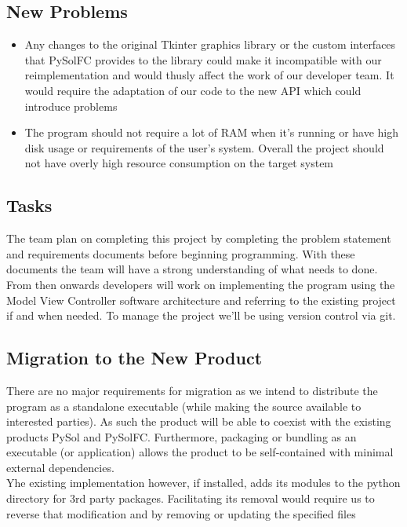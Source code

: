 \documentclass{article}
\begin{document}
		\subsection{New Problems}
		\begin{itemize}
		\itemsep0em	
			\item Any changes to the original Tkinter graphics library or the 
			custom interfaces that PySolFC provides to the library could make it
			incompatible with our reimplementation and would thusly affect the work of
			our developer team. It would require the adaptation of our code to the new
			API which could introduce problems
			\item The program should not require a lot of RAM when it’s running or
			have high disk usage or requirements of the user’s system. Overall the
			project should not have overly high resource consumption on the target system\\
		\end{itemize}
		\subsection{Tasks}
			\indent The team plan on completing this project by completing the problem
			statement and requirements documents before beginning programming. With these
			documents the team will have a strong understanding of what needs to done.
			From then onwards developers will work on implementing the program using
			the Model View Controller software architecture and referring to the existing
			project if and when needed. To manage the project we’ll be using version
			control via git.\\


		\subsection{Migration to the New Product}
			\indent There are no major requirements for migration as we intend to
			distribute the program as a standalone executable (while making the source
			available to interested parties). As such the product will be able to coexist
			with the existing products PySol and PySolFC. Furthermore, packaging
			or bundling as an executable (or application) allows the product to be
			self-contained with minimal external dependencies.\\
			\indent Yhe existing implementation however, if installed, adds its modules
			to the python directory for 3rd party packages. Facilitating its removal
			would require us to reverse that modification and by removing or updating
			the specified files\\
\end{document}
